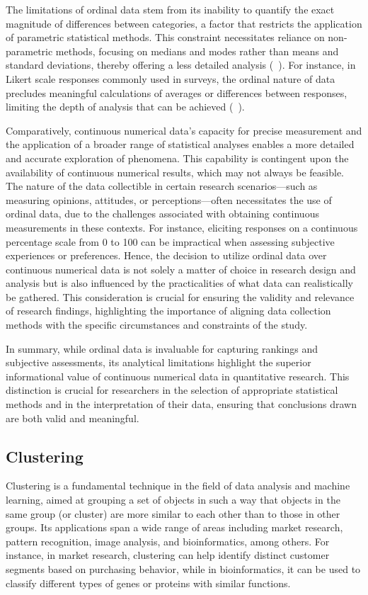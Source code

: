 \documentclass{article}
\begin{document}
The limitations of ordinal data stem from its inability to quantify the exact magnitude of differences between categories, a factor that restricts the application of parametric statistical methods. This constraint necessitates reliance on non-parametric methods, focusing on medians and modes rather than means and standard deviations, thereby offering a less detailed analysis (~\cite{Conover1999}). 
For instance, in Likert scale responses commonly used in surveys, the ordinal nature of data precludes meaningful calculations of averages or differences between responses, limiting the depth of analysis that can be achieved (~\cite{Likert1932}).

Comparatively, continuous numerical data's capacity for precise measurement and the application of a broader range of statistical analyses enables a more detailed and accurate exploration of phenomena. 
This capability is contingent upon the availability of continuous numerical results, which may not always be feasible. The nature of the data collectible in certain research scenarios—such as measuring opinions, attitudes, or perceptions—often necessitates the use of ordinal data, due to the challenges associated with obtaining continuous measurements in these contexts. For instance, eliciting responses on a continuous percentage scale from 0 to 100 can be impractical when assessing subjective experiences or preferences. Hence, the decision to utilize ordinal data over continuous numerical data is not solely a matter of choice in research design and analysis but is also influenced by the practicalities of what data can realistically be gathered. This consideration is crucial for ensuring the validity and relevance of research findings, highlighting the importance of aligning data collection methods with the specific circumstances and constraints of the study.

In summary, while ordinal data is invaluable for capturing rankings and subjective assessments, 
its analytical limitations highlight the superior informational value of continuous numerical data in quantitative research. 
This distinction is crucial for researchers in the selection of appropriate statistical methods and in the interpretation of their data, 
ensuring that conclusions drawn are both valid and meaningful.

\subsection{Clustering}

Clustering is a fundamental technique in the field of data analysis and machine learning, aimed at grouping a set of objects in such a way that objects in the same group (or cluster) are more similar to each other than to those in other groups. Its applications span a wide range of areas including market research, pattern recognition, image analysis, and bioinformatics, among others. For instance, in market research, clustering can help identify distinct customer segments based on purchasing behavior, while in bioinformatics, it can be used to classify different types of genes or proteins with similar functions.
\end{document}
